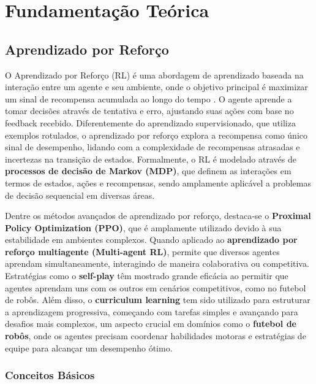 \chapter{Fundamentação Teórica}
\label{cap:fund}

\section{Aprendizado por Reforço}
\label{sec:rl}

O Aprendizado por Reforço (RL) é uma abordagem de aprendizado baseada na interação entre um agente e seu ambiente, onde o objetivo principal é maximizar um sinal de recompensa acumulada ao longo do tempo \cite{sutton}. O agente aprende a tomar decisões através de tentativa e erro, ajustando suas ações com base no feedback recebido. Diferentemente do aprendizado supervisionado, que utiliza exemplos rotulados, o aprendizado por reforço explora a recompensa como único sinal de desempenho, lidando com a complexidade de recompensas atrasadas e incertezas na transição de estados. Formalmente, o RL é modelado através de \textbf{processos de decisão de Markov (MDP)}, que definem as interações em termos de estados, ações e recompensas, sendo amplamente aplicável a problemas de decisão sequencial em diversas áreas.

Dentre os métodos avançados de aprendizado por reforço, destaca-se o \textbf{Proximal Policy Optimization (PPO)}, que é amplamente utilizado devido à sua estabilidade em ambientes complexos. Quando aplicado ao \textbf{aprendizado por reforço multiagente (Multi-agent RL)}, permite que diversos agentes aprendam simultaneamente, interagindo de maneira colaborativa ou competitiva. Estratégias como o \textbf{self-play} têm mostrado grande eficácia ao permitir que agentes aprendam uns com os outros em cenários competitivos, como no futebol de robôs. Além disso, o \textbf{curriculum learning} tem sido utilizado para estruturar a aprendizagem progressiva, começando com tarefas simples e avançando para desafios mais complexos, um aspecto crucial em domínios como o \textbf{futebol de robôs}, onde os agentes precisam coordenar habilidades motoras e estratégias de equipe para alcançar um desempenho ótimo.

\subsection{Conceitos Básicos}
\label{subsec:rl_conceitos}

